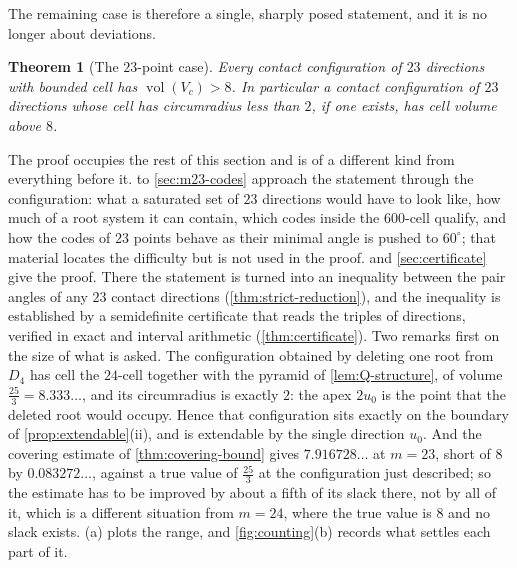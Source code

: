\documentclass[11pt,reqno]{amsart}
\renewcommand{\_}{\origunderscore\allowbreak}
\numberwithin{equation}{section}
\theoremstyle{plain}
\newtheorem{thm}{Theorem}[section]
\theoremstyle{definition}
\theoremstyle{remark}
\newcommand{\base}{u}                        %
\DeclareMathOperator{\vol}{vol}
\begin{document}
The remaining case is therefore a single, sharply posed statement, and
it is no longer about deviations.

\begin{thm}[The $23$-point case]\label{thm:m23}
Every contact configuration of $23$ directions with bounded cell has
$\vol(V_c)>8$. In particular a contact configuration of $23$ directions
whose cell has circumradius less than $2$, if one exists, has cell
volume above $8$.
\end{thm}

The proof occupies the rest of this section and is of a different kind
from everything before it.  to
\cref{sec:m23-codes} approach the statement through the configuration:
what a saturated set of $23$ directions would have to look like, how
much of a root system it can contain, which codes inside the $600$-cell
qualify, and how the codes of $23$ points behave as their minimal angle is
pushed to $60^\circ$; that material locates the difficulty but is not
used in the proof.  and
\cref{sec:certificate} give the proof. There the
statement is turned into an inequality between the pair angles of any
$23$ contact directions (\cref{thm:strict-reduction}), and the
inequality is established by a semidefinite certificate that reads the
triples of directions, verified in exact and interval arithmetic
(\cref{thm:certificate}). Two remarks first on the size of what is
asked. The configuration obtained by deleting
one root from $D_4$ has cell the $24$-cell together with the pyramid of
\cref{lem:Q-structure}, of volume $\tfrac{25}3=8.333\ldots$, and its
circumradius is exactly $2$: the apex $2\base_0$ is the point that the
deleted root would occupy. Hence that configuration sits exactly on the
boundary of \cref{prop:extendable}(ii), and is extendable by the single
direction $\base_0$. And the covering estimate of
\cref{thm:covering-bound} gives $7.916728\ldots$ at $m=23$, short of $8$
by $0.083272\ldots$, against a true value of $\tfrac{25}3$ at the
configuration just described; so the estimate has to be improved by
about a fifth of its slack there, not by all of it, which is a different
situation from $m=24$, where the true value is $8$ and no slack exists.
(a) plots the range, and \cref{fig:counting}(b)
records what settles each part of it.
\end{document}
